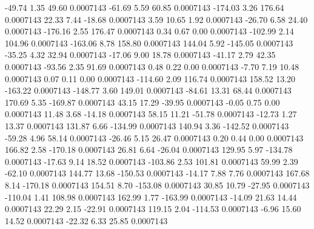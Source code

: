       -49.74        1.35       49.60     0.0007143
      -61.69        5.59       60.85     0.0007143
     -174.03        3.26      176.64     0.0007143
       22.33        7.44      -18.68     0.0007143
        3.59       10.65        1.92     0.0007143
      -26.70        6.58       24.40     0.0007143
     -176.16        2.55      176.47     0.0007143
        0.34        0.67        0.00     0.0007143
     -102.99        2.14      104.96     0.0007143
     -163.06        8.78      158.80     0.0007143
      144.04        5.92     -145.05     0.0007143
      -35.25        4.32       32.94     0.0007143
      -17.06        9.00       18.78     0.0007143
      -41.17        2.79       42.35     0.0007143
      -93.56        2.35       91.69     0.0007143
        0.48        0.22        0.00     0.0007143
       -7.70        7.19       10.48     0.0007143
        0.07        0.11        0.00     0.0007143
     -114.60        2.09      116.74     0.0007143
      158.52       13.20     -163.22     0.0007143
     -148.77        3.60      149.01     0.0007143
      -84.61       13.31       68.44     0.0007143
      170.69        5.35     -169.87     0.0007143
       43.15       17.29      -39.95     0.0007143
       -0.05        0.75        0.00     0.0007143
       11.48        3.68      -14.18     0.0007143
       58.15       11.21      -51.78     0.0007143
      -12.73        1.27       13.37     0.0007143
      131.87        6.66     -134.99     0.0007143
      140.94        3.36     -142.52     0.0007143
      -59.28        4.96       58.14     0.0007143
      -26.46        5.15       26.47     0.0007143
        0.20        0.44        0.00     0.0007143
      166.82        2.58     -170.18     0.0007143
       26.81        6.64      -26.04     0.0007143
      129.95        5.97     -134.78     0.0007143
      -17.63        9.14       18.52     0.0007143
     -103.86        2.53      101.81     0.0007143
       59.99        2.39      -62.10     0.0007143
      144.77       13.68     -150.53     0.0007143
      -14.17        7.88        7.76     0.0007143
      167.68        8.14     -170.18     0.0007143
      154.51        8.70     -153.08     0.0007143
       30.85       10.79      -27.95     0.0007143
     -110.04        1.41      108.98     0.0007143
      162.99        1.77     -163.99     0.0007143
      -14.09       21.63       14.44     0.0007143
       22.29        2.15      -22.91     0.0007143
      119.15        2.04     -114.53     0.0007143
       -6.96       15.60       14.52     0.0007143
      -22.32        6.33       25.85     0.0007143
